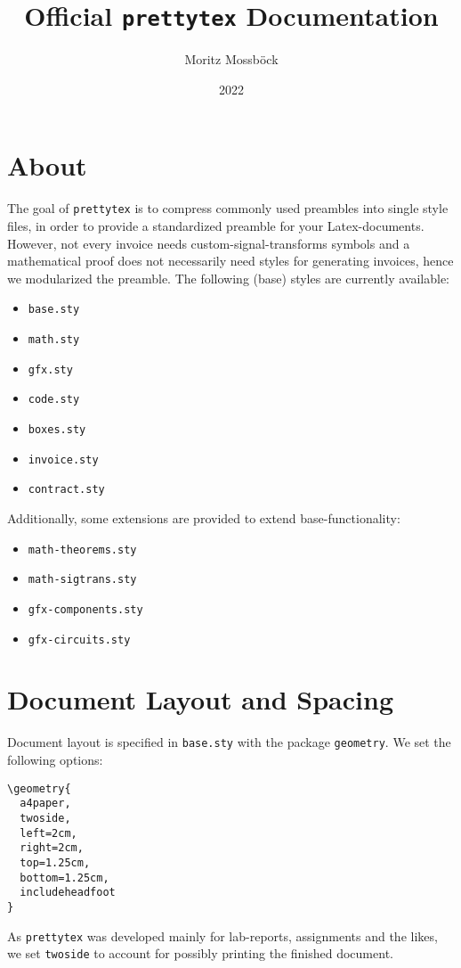 \documentclass{article}
\author{Moritz Mossböck}
\date{2022}
\title{Official \texttt{prettytex} Documentation}
\newcommand{\prettytex}{\texttt{prettytex} }
\begin{document}
\maketitle
\tableofcontents
\newpage
{}

\section{About}
The goal of \prettytex is to compress commonly used preambles into single style files, in order to provide a 
standardized preamble for your Latex-documents. However, not every invoice needs custom-signal-transforms symbols
and a mathematical proof does not necessarily need styles for generating invoices, hence we modularized the 
preamble. The following (base) styles are currently available:
\begin{itemize}
  \item \texttt{base.sty}
  \item \texttt{math.sty}
  \item \texttt{gfx.sty}
  \item \texttt{code.sty}
  \item \texttt{boxes.sty}
  \item \texttt{invoice.sty}
  \item \texttt{contract.sty}
\end{itemize}

Additionally, some extensions are provided to extend base-functionality:
\begin{itemize}
  \item \texttt{math-theorems.sty}
  \item \texttt{math-sigtrans.sty}
  \item \texttt{gfx-components.sty}
  \item \texttt{gfx-circuits.sty}
\end{itemize}


\section{Document Layout and Spacing}
Document layout is specified in \verb|base.sty| with the package \verb|geometry|. We set the following options:
\begin{verbatim}
\geometry{
  a4paper,
  twoside,
  left=2cm,
  right=2cm,
  top=1.25cm,
  bottom=1.25cm,
  includeheadfoot
}
\end{verbatim}

As \verb|prettytex| was developed mainly for lab-reports, assignments and the likes, we set \verb|twoside| to 
account for possibly printing the finished document. 
\end{document}
